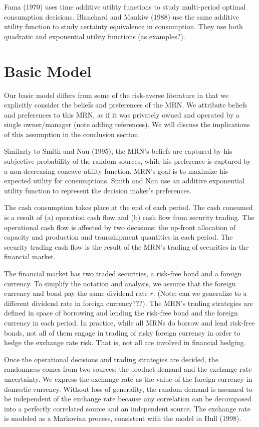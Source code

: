 \documentclass{article}[12pt letter]
\begin{document}
Fama (1970) uses time additive utility functions to study multi-period optimal consumption decisions.  Blanchard and Mankiw (1988) use the same additive utility function to study certainty equivalence in consumption. They use both quadratic and exponential utility functions (as examples?).

\section{Basic Model \label{sect:basicModel}}


Our basic model differs from some of the risk-averse literature in that we explicitly consider the beliefs and preferences of the MRN. We attribute beliefs and preferences to this MRN, as if it was privately owned and operated by a single owner/manager (note adding references). We will discuss the implications of this assumption in the conclusion section.

Similarly to Smith and Nau (1995), the MRN's beliefs are captured by his subjective probability of the random sources, while his preference is captured by a non-decreasing concave utility function. MRN's goal is to maximize his expected utility for consumptions. Smith and Nau use an additive exponential utility function to represent the decision maker's preferences.


The cash consumption takes place at the end of each period. The cash consumed is  a result of (a) operation cash flow and (b) cash flow from security trading. The operational cash flow is affected by two decisions: the up-front allocation of capacity and production and transshipment quantities in each period.  The security trading cash flow is the result of the MRN's trading of securities in the financial market.

The financial market has two traded securities, a risk-free bond and a foreign currency. To simplify the notation and analysis, we assume that the foreign currency and bond pay the same dividend rate $r$.  (Note: can we generalize to a different dividend rate in foreign currency???). The MRN's trading strategies are defined in space of  borrowing and lending the risk-free bond and the foreign currency in each period. In practice, while all MRNs do borrow and lend risk-free bonds, not all of them engage in trading of risky foreign currency in order to hedge the exchange rate risk. That is, not all are involved in financial hedging.


Once the operational decisions and trading strategies are decided, the randomness comes from two sources: the product demand and the exchange rate uncertainty. We express the exchange rate as the value of the foreign currency in domestic currency. Without loss of generality, the random demand is assumed to be independent of the exchange rate because any correlation can be decomposed into a perfectly correlated source and an independent source. The exchange rate is modeled as a Markovian process, consistent with the model in Hull (1998).
\end{document}
